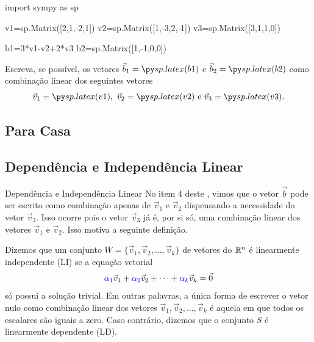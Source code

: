 \begin{frame}[label=lild,fragile]
\begin{pycode} 
import sympy as sp

v1=sp.Matrix([2,1,-2,1])
v2=sp.Matrix([1,-3,2,-1])
v3=sp.Matrix([3,1,1,0])

b1=3*v1-v2+2*v3
b2=sp.Matrix([1,-1,0,0])

\end{pycode} 
\begin{casa}
Escreva, se possível,  os vetores {\color{blue}\(\vec{b}_1=\pyl{b1}\)} e {\color{blue}\(\vec{b}_2=\pyl{b2}\)} como combinação linear dos seguintes vetores
\[
\vec{v}_1=\pyl{v1},\ \vec{v}_2=\pyl{v2} \text{ e } \vec{v}_3=\pyl{v3}.
\]
\end{casa}
\subsection*{Para Casa \thecasa}
\end{frame}



\subsection*{Dependência e Independência Linear}
\begin{frame}[label=lild]{Dependência e Independência Linear}
No item 4 deste \hyperlink{exem.comb}{}, vimos que o vetor $\vec{b}$ pode ser escrito como combinação apenas de \(\vec{v}_1\) e \(\vec{v}_2\) dispensando a necessidade do vetor \(\vec{v}_3\). Isso ocorre pois o vetor \(\vec{v}_3\) já é, por si só, uma combinação linear dos vetores \(\vec{v}_1\) e \(\vec{v}_2\). Isso motiva a seguinte definição.

\begin{defin}
Dizemos que um conjunto $W=\{\vec{v}_1,\vec{v}_2,\ldots,\vec{v}_k\}$ de vetores do $\mathbb{R}^n$ é {\color{blue} linearmente independente (LI)} se a equação vetorial
\[{\color{blue}\alpha_1}\vec{v}_1+{\color{blue}\alpha_2}\vec{v}_2+\cdots +{\color{blue}\alpha_k}\vec{v}_k=\vec{0}\]
{\color{red}só possui a solução trivial}. Em outras palavras, a única forma de escrever o vetor nulo como combinação linear dos vetores $\vec{v}_1,\vec{v}_2,\ldots, \vec{v}_k$ é aquela em que todos os escalares são iguais a zero. Caso contrário, dizemos que o conjunto $S$ é {\color{blue}linearmente dependente (LD)}.
\end{defin}
\end{frame}

